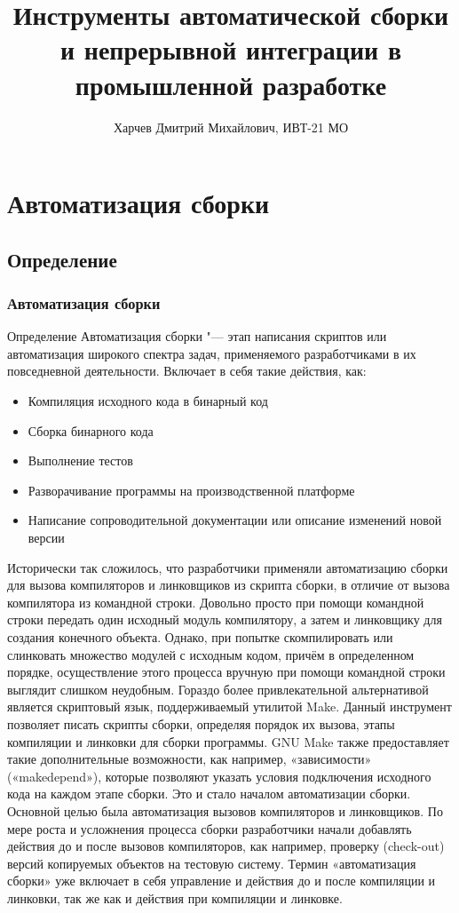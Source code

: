 \documentclass{../industrial-development}
\title{Инструменты автоматической сборки и непрерывной интеграции в промышленной разработке}
\author{Харчев Дмитрий Михайлович, ИВТ-21 МО}
\date{}
\begin{document}
\begin{frame}
  \titlepage
\end{frame}

\section{Автоматизация сборки}

\subsection{Определение}

\begin{frame} \frametitle{Автоматизация сборки}
	\begin{block}{Определение}
		Автоматизация сборки "--- этап написания скриптов или автоматизация широкого спектра задач, применяемого разработчиками в их повседневной деятельности. Включает в себя такие действия, как: 
	\end{block}
	
	\begin{itemize}
		\item Компиляция исходного кода в бинарный код 
		\item Сборка бинарного кода 
		\item Выполнение тестов 
		\item Разворачивание программы на производственной платформе 
		\item Написание сопроводительной документации или описание изменений новой версии 
	\end{itemize}
\end{frame}

\lecturenotes
Исторически так сложилось, что разработчики применяли автоматизацию сборки для вызова компиляторов и линковщиков из скрипта сборки, в отличие от вызова компилятора из командной строки. Довольно просто при помощи командной строки передать один исходный модуль компилятору, а затем и линковщику для создания конечного объекта. Однако, при попытке скомпилировать или слинковать множество модулей с исходным кодом, причём в определенном порядке, осуществление этого процесса вручную при помощи командной строки выглядит слишком неудобным. Гораздо более привлекательной альтернативой является скриптовый язык, поддерживаемый утилитой Make. Данный инструмент позволяет писать скрипты сборки, определяя порядок их вызова, этапы компиляции и линковки для сборки программы. GNU Make также предоставляет такие дополнительные возможности, как например, «зависимости» («makedepend»), которые позволяют указать условия подключения исходного кода на каждом этапе сборки. Это и стало началом автоматизации сборки. Основной целью была автоматизация вызовов компиляторов и линковщиков. По мере роста и усложнения процесса сборки разработчики начали добавлять действия до и после вызовов компиляторов, как например, проверку (check-out) версий копируемых объектов на тестовую систему. Термин «автоматизация сборки» уже включает в себя управление и действия до и после компиляции и линковки, так же как и действия при компиляции и линковке.
\end{document}
